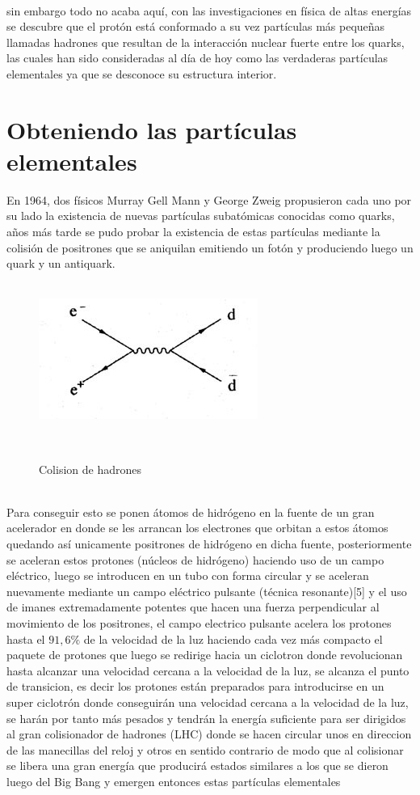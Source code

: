 \documentclass[%
 reprint,
 amsmath,amssymb,
 aps,
]{revtex4-2}
\begin{document}
\\
 sin embargo todo no acaba aquí, con las investigaciones en física de altas energías se descubre que el protón está conformado a su vez partículas más pequeñas llamadas hadrones que resultan de la interacción nuclear fuerte entre los quarks, las cuales han sido consideradas al día de hoy como las verdaderas partículas elementales ya que se desconoce su estructura interior.\\
\section{\label{sec:level1}Obteniendo las partículas elementales}
En 1964, dos físicos Murray Gell Mann y George Zweig propusieron cada uno por su lado la existencia de nuevas partículas subatómicas conocidas como quarks, años más tarde se pudo probar la existencia de estas partículas mediante la colisión de positrones que se aniquilan emitiendo un fotón y produciendo luego un quark y un antiquark.\\
\\
\begin{figure}[H]
\begin{center}
\includegraphics[scale=0.86]{figure1_8.jpeg}
\caption{Colision de hadrones}\\
\centering
\end{center}
\end{figure}
\\
Para conseguir esto se ponen átomos de hidrógeno en la fuente de un gran acelerador en donde se les arrancan los electrones que orbitan a estos átomos quedando así unicamente positrones de hidrógeno en dicha fuente, posteriormente se aceleran estos protones (núcleos de hidrógeno) haciendo uso de un campo eléctrico, luego se introducen en un tubo con forma circular y se aceleran nuevamente mediante un campo eléctrico pulsante (técnica resonante)[5] y el uso de imanes extremadamente potentes que hacen una fuerza perpendicular al movimiento de los positrones, el campo electrico pulsante acelera los protones hasta el $ 91,6\%$ de la velocidad de la luz haciendo cada vez más compacto el paquete de protones que luego se redirige hacia un ciclotron donde revolucionan hasta alcanzar una velocidad cercana a la velocidad de la luz, se alcanza el punto de transicion, es decir los protones están preparados para introducirse en un super ciclotrón donde conseguirán una velocidad cercana a la velocidad de la luz, se harán por tanto más pesados y tendrán la energía suficiente para ser dirigidos al gran colisionador de hadrones (LHC) donde se hacen circular unos en direccion de las manecillas del reloj y otros en sentido contrario de modo que al colisionar se libera una gran energía que producirá estados similares a los que se dieron luego del Big Bang y emergen entonces estas partículas elementales
\end{document}
